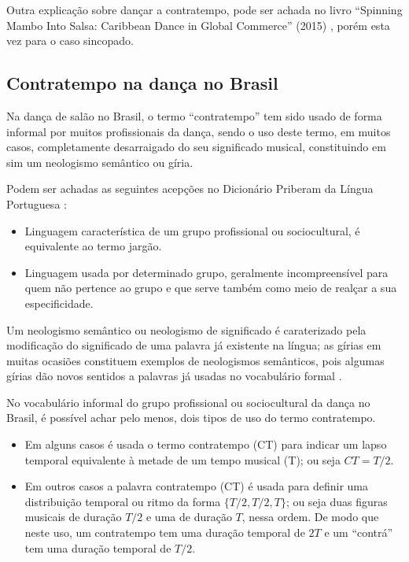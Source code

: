 Outra explicação sobre dançar a contratempo, pode ser achada
no livro ``Spinning Mambo Into Salsa: Caribbean Dance in Global Commerce'' (2015) \cite[pp. 68]{mcmains2015spinning},
porém esta vez para o caso sincopado. 


\subsection{Contratempo na dança no Brasil}
\label{subsec:contratempobrasil}
Na dança de salão no Brasil, 
o termo ``contratempo'' tem sido usado de forma informal por muitos profissionais da dança,
sendo o uso deste termo, em muitos casos, completamente desarraigado do seu significado musical,
constituindo em sim um neologismo semântico ou gíria.

\begin{definition}[Gíria] 
\label{def:Giria}
Podem ser achadas as seguintes acepções no Dicionário Priberam da Língua Portuguesa \cite{priberamgiria}:
\begin{itemize}
\item Linguagem característica de um grupo profissional ou sociocultural, é equivalente ao termo jargão.
\item Linguagem usada por determinado grupo, 
geralmente incompreensível para quem não pertence ao grupo e que serve também como meio de realçar a sua especificidade.
\end{itemize}
\end{definition}

\begin{definition} 
\label{def:NeologismoSemantico}
Um neologismo semântico ou neologismo de significado é caraterizado pela modificação 
do significado de uma palavra já existente na língua;
as gírias em muitas ocasiões constituem exemplos de neologismos semânticos, 
pois algumas gírias dão novos sentidos a palavras já usadas no vocabulário formal \cite[pp. 82-83]{correalingua}.
\end{definition}

No vocabulário informal do grupo profissional ou sociocultural da dança no Brasil,
é possível achar pelo menos, dois tipos de uso do termo contratempo.
\begin{itemize}
\item Em alguns casos é usada o termo contratempo (CT) para indicar um lapso temporal 
equivalente à metade de um tempo musical (T); ou seja $CT=T/2$.
\item Em outros casos a palavra contratempo (CT) é usada para definir uma distribuição temporal 
ou ritmo da forma $\{T/2, T/2, T\}$; ou seja duas figuras musicais de duração $T/2$ e uma de duração $T$,
nessa ordem. De modo que neste uso, um contratempo tem uma duração temporal de $2T$
e um ``contrá'' tem uma duração temporal de $T/2$. 
\end{itemize}

